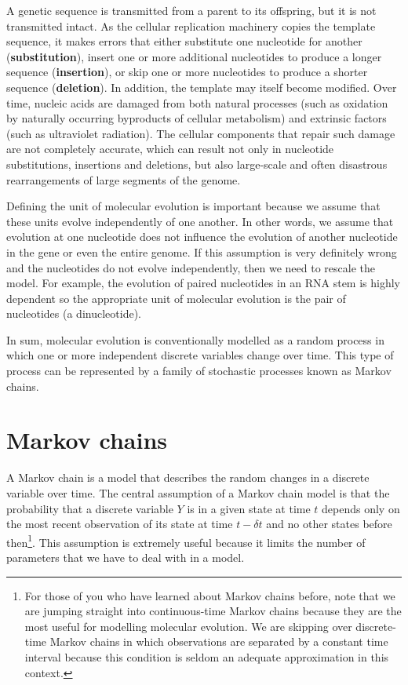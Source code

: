 \documentclass[12pt,twoside,openright]{book}
\begin{document}
A genetic sequence is transmitted from a parent to its offspring, but it is not transmitted intact.  As the cellular replication machinery copies the template sequence, it makes errors that either substitute one nucleotide for another (\textbf{substitution}), insert one or more additional nucleotides to produce a longer sequence (\textbf{insertion}), or skip one or more nucleotides to produce a shorter sequence (\textbf{deletion}).  In addition, the template may itself become modified.  Over time, nucleic acids are damaged from both natural processes (such as oxidation by naturally occurring byproducts of cellular metabolism) and extrinsic factors (such as ultraviolet radiation).  The cellular components that repair such damage are not completely accurate, which can result not only in nucleotide substitutions, insertions and deletions, but also large-scale and often disastrous rearrangements of large segments of the genome.

Defining the unit of molecular evolution is important because we assume that these units evolve independently of one another.  In other words, we assume that evolution at one nucleotide does not influence the evolution of another nucleotide in the gene or even the entire genome.  If this assumption is very definitely wrong and the nucleotides do not evolve independently, then we need to rescale the model.  For example, the evolution of paired nucleotides in an RNA stem is highly dependent \cite{Muse:1994} so the appropriate unit of molecular evolution is the pair of nucleotides (a dinucleotide).

In sum, molecular evolution is conventionally modelled as a random process in which one or more independent discrete variables change over time.  This type of process can be represented by a family of stochastic processes known as Markov chains.  


\section {Markov chains}

A Markov chain is a model that describes the random changes in a discrete variable over time.  The central assumption of a Markov chain model is that the probability that a discrete variable $Y$ is in a given state at time $t$ depends only on the most recent observation of its state at time $t-\delta t$ and no other states before then\footnote{For those of you who have learned about Markov chains before, note that we are jumping straight into continuous-time Markov chains because they are the most useful for modelling molecular evolution.  We are skipping over discrete-time Markov chains in which observations are separated by a constant time interval because this condition is seldom an adequate approximation in this context.}.  This assumption is extremely useful because it limits the number of parameters that we have to deal with in a model.  
\end{document}
